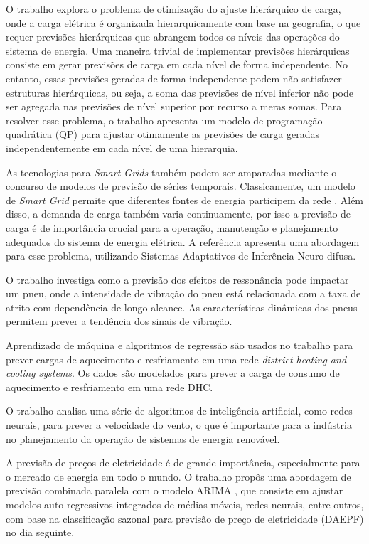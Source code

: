 O trabalho \cite{8413116} explora o problema de otimização do ajuste hierárquico de carga, onde a carga elétrica é organizada hierarquicamente com base na geografia, o que requer previsões hierárquicas que abrangem todos os níveis das operações do sistema de energia. Uma maneira trivial de implementar previsões hierárquicas consiste em gerar previsões de carga em cada nível de forma independente. No entanto, essas previsões geradas de forma independente podem não satisfazer estruturas hierárquicas, ou seja, a soma das previsões de nível inferior não pode ser agregada nas previsões de nível superior por recurso a meras somas. Para resolver esse problema, o trabalho \cite{8413116} apresenta um modelo de programação quadrática (QP) para ajustar otimamente as previsões de carga geradas independentemente em cada nível de uma hierarquia.

As tecnologias para \textit{Smart Grids} também podem ser amparadas mediante o concurso de modelos de previsão de séries temporais. Classicamente, um modelo de \emph{Smart Grid} permite que diferentes fontes de energia participem da rede \cite{8408964}. Além disso, a demanda de carga também varia continuamente, por isso a previsão de carga é de importância crucial para a operação, manutenção e planejamento adequados do sistema de energia elétrica. A referência \cite{8408964} apresenta uma abordagem para esse problema, utilizando Sistemas Adaptativos de Inferência Neuro-difusa.

O trabalho \cite{8410563} investiga como a previsão dos efeitos de ressonância pode impactar um pneu, onde a intensidade de vibração do pneu está relacionada com a taxa de atrito com dependência de longo alcance. As características dinâmicas dos pneus permitem prever a tendência dos sinais de vibração.

Aprendizado de máquina e algoritmos de regressão são usados no trabalho \cite{8403331} para prever cargas de aquecimento e resfriamento em uma rede \textit{district heating and cooling systems}. Os dados são modelados para prever a carga de consumo de aquecimento e resfriamento em uma rede DHC.

O trabalho \cite{8408773} analisa uma série de algoritmos de inteligência artificial, como redes neurais, para prever a velocidade do vento, o que é importante para a indústria no planejamento da operação de sistemas de energia renovável.

A previsão de preços de eletricidade é de grande importância, especialmente para o mercado de energia em todo o mundo. O trabalho \cite{8403372} propôs uma abordagem de previsão combinada paralela com o modelo ARIMA \cite{box1970time}, que consiste em ajustar modelos auto-regressivos integrados de médias móveis, redes neurais, entre outros, com base na classificação sazonal para previsão de preço de eletricidade (DAEPF) no dia seguinte. 

